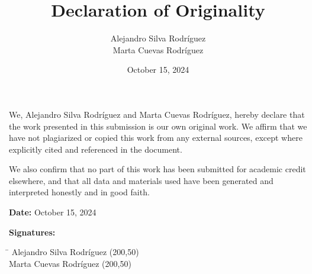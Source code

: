 \documentclass{article}
\title{Declaration of Originality}
\author{Alejandro Silva Rodríguez \\ Marta Cuevas Rodríguez}
\date{October 15, 2024}
\begin{document}
	
	\maketitle
	
	We, Alejandro Silva Rodríguez and Marta Cuevas Rodríguez, hereby declare that the work presented in this submission is our own original work. We affirm that we have not plagiarized or copied this work from any external sources, except where explicitly cited and referenced in the document.
	
	We also confirm that no part of this work has been submitted for academic credit elsewhere, and that all data and materials used have been generated and interpreted honestly and in good faith.
	
	\vspace{2cm}
	
	\noindent
	\textbf{Date:} \hspace{1cm} October 15, 2024
	
	\vspace{3cm}
	
	\noindent
	\textbf{Signatures:}
	
	\vspace{1.5cm}
	
	\noindent
	\begin{tabbing}
		\hspace{5cm} \= \hspace{8cm} \kill
		Alejandro Silva Rodríguez \> \framebox(200,50){} \\[2cm]
		Marta Cuevas Rodríguez \> \framebox(200,50){}
	\end{tabbing}
	
\end{document}
